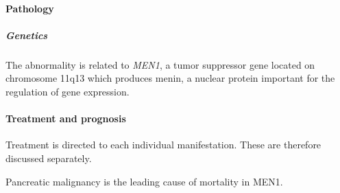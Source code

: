 \paragraph{Pathology}

\subparagraph{Genetics}

The abnormality is related to \emph{MEN1}, a tumor suppressor gene located on chromosome 11q13 which produces menin, a nuclear protein important for the regulation of gene expression.

\paragraph{Treatment and prognosis}

Treatment is directed to each individual manifestation. These are therefore discussed separately.

Pancreatic malignancy is the leading cause of mortality in MEN1.